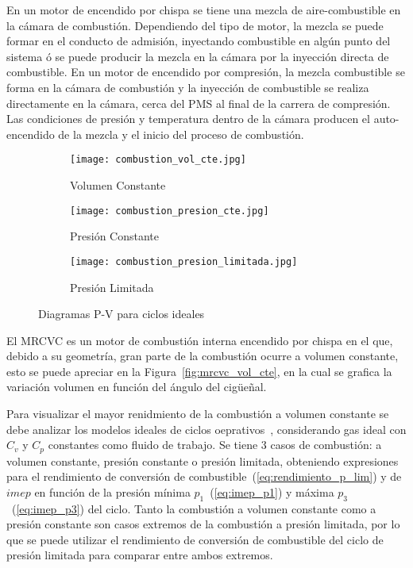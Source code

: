 En un motor de encendido por chispa se tiene una mezcla de aire-combustible en
la cámara de combustión.
%
Dependiendo del tipo de motor, la mezcla se puede formar en el conducto de
admisión, inyectando combustible en algún punto del sistema ó se puede producir
la mezcla en la cámara por la inyección directa de combustible.
%
En un motor de encendido por compresión, la mezcla combustible se forma en la
cámara de combustión y la inyección de combustible se realiza directamente en la
cámara, cerca del PMS al final de la carrera de compresión.
%
Las condiciones de presión y temperatura dentro de la cámara producen el
auto-encendido de la mezcla y el inicio del proceso de combustión.

\begin{figure}[ht]
  \centering
  \begin{subfigure}{0.33\textwidth}
    \centering
    \texttt{[image: combustion\_vol\_cte.jpg]}
    \caption{Volumen Constante}\label{fig:comb_vcte}
  \end{subfigure}%
  \begin{subfigure}{0.33\textwidth}
    \centering
    \texttt{[image: combustion\_presion\_cte.jpg]}
    \caption{Presión Constante}\label{fig:comb_pcte}
  \end{subfigure}%
  \begin{subfigure}{0.4\textwidth}
    \centering
    \texttt{[image: combustion\_presion\_limitada.jpg]}
    \caption{Presión Limitada}\label{fig:comb_plim}
  \end{subfigure}
  \caption{Diagramas P-V para ciclos ideales\parencite{heywood}}\label{fig:ciclos_ideales}
\end{figure}

El MRCVC es un motor de combustión interna encendido por chispa en el que,
debido a su geometría, gran parte de la combustión ocurre a volumen constante,
esto se puede apreciar en la Figura~\ref{fig:mrcvc_vol_cte}, en la cual se
grafica la variación volumen en función del ángulo del cigüeñal.
%
%


%
Para visualizar el mayor renidmiento de la combustión a volumen constante  se
debe analizar los modelos ideales de ciclos oeprativos~\parencite{heywood},
considerando gas ideal con $C_{v}$ y $C_{p}$ constantes como fluido de trabajo.
%
Se tiene 3 casos de combustión: a volumen constante, presión constante o presión
limitada, obteniendo expresiones para el rendimiento de conversión de
combustible~(\ref{eq:rendimiento_p_lim}) y de $imep$ en función de la presión
mínima $p_1$~(\ref{eq:imep_p1}) y máxima $p_3$~(\ref{eq:imep_p3}) del ciclo.
%
Tanto la combustión a volumen constante como a presión constante son casos
extremos de la combustión a presión limitada, por lo que se puede utilizar el
rendimiento de conversión de combustible del ciclo de presión limitada para
comparar entre ambos extremos.

